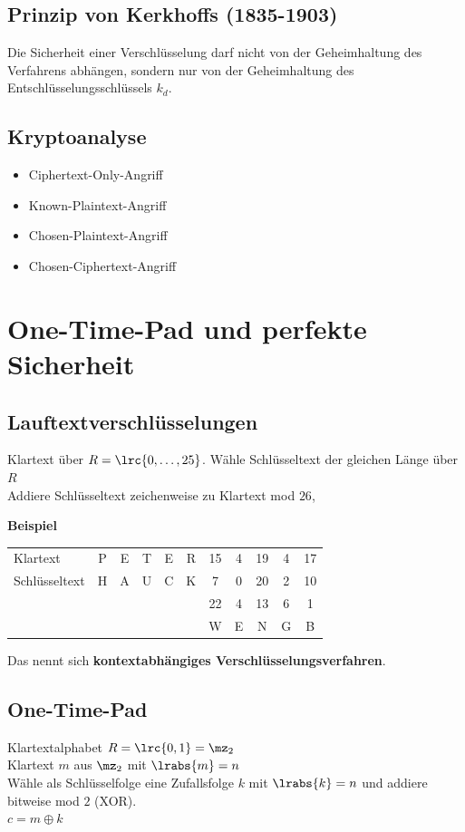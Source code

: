 	\subsection{Prinzip von Kerkhoffs (1835-1903)}
		Die Sicherheit einer Verschlüsselung darf nicht von der Geheimhaltung des Verfahrens abhängen, sondern nur von der Geheimhaltung des Entschlüsselungsschlüssels $k_d$.
	\subsection{Kryptoanalyse}
		\begin{itemize}
			\item Ciphertext-Only-Angriff
			\item Known-Plaintext-Angriff
			\item Chosen-Plaintext-Angriff
			\item Chosen-Ciphertext-Angriff
	\end{itemize}
\section{One-Time-Pad und perfekte Sicherheit}
	\subsection{Lauftextverschlüsselungen}
		Klartext über $R=\lrc{0,\dots,25}$. Wähle Schlüsseltext der gleichen Länge über $R$\\
		Addiere Schlüsseltext zeichenweise zu Klartext mod $26$,
		
		\textbf{Beispiel}
		
		\begin{tabular}{lcccccccccc}
			Klartext&P&E&T&E&R&15&4&19&4&17\\
			Schlüsseltext&H&A&U&C&K&7&0&20&2&10\\\cline{7-11}
			&&&&&&22&4&13&6&1\\
			&&&&&&W&E&N&G&B
		\end{tabular}
		
		Das nennt sich \textbf{kontextabhängiges Verschlüsselungsverfahren}.
	\subsection{One-Time-Pad}
		Klartextalphabet $R=\lrc{0,1}=\mz_2$\\
		Klartext $m$ aus $\mz_2$ mit $\lrabs{m}=n$\\
		Wähle als Schlüsselfolge eine Zufallsfolge $k$ mit $\lrabs{k}=n$ und addiere bitweise mod $2$ (XOR).\\
		$c=m\oplus k$
		
